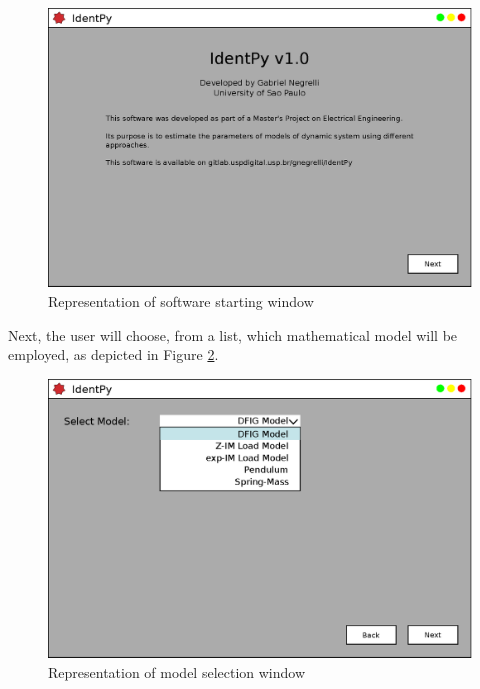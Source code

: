 \begin{figure}[h]
	\caption{Representation of software starting window}
	\begin{center}
		\includegraphics[scale=.5]{Images/Software_init_pg.eps}
	\end{center}
	\label{fig: init_pg}
\end{figure}

Next, the user will choose, from a list, which mathematical model will be employed, as depicted in Figure \ref{fig: pg1}. 

\begin{figure}[h]
	\caption{Representation of model selection window}
	\begin{center}
		\includegraphics[scale=.5]{Images/Software_pg1.eps}
	\end{center}
	\label{fig: pg1}
\end{figure}

